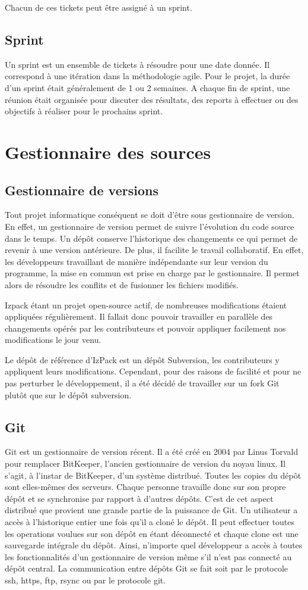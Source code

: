 Chacun de ces tickets peut être assigné à un sprint.
\subsection{Sprint}
Un sprint est un ensemble de tickets à résoudre pour une date donnée.
Il correspond à une itération dans la méthodologie agile.
Pour le projet, la durée d'un sprint était généralement de 1 ou 2 semaines.
A chaque fin de sprint, une réunion était organisée pour discuter des résultats, des reports à effectuer ou des objectifs à réaliser pour le prochains sprint.
\section{Gestionnaire des sources}
\subsection{Gestionnaire de versions}
Tout projet informatique conséquent se doit d'être sous gestionnaire de version.
En effet, un gestionnaire de version permet de suivre l'évolution du code source dans le temps.
Un dépôt conserve l'historique des changements ce qui permet de revenir à une version antérieure.
De plus, il facilite le travail collaboratif.
En effet, les développeurs travaillant de manière indépendante sur leur version du programme, la mise en commun est prise en charge par le gestionnaire.
Il permet alors de résoudre les conflits et de fusionner les fichiers modifiés.

Izpack étant un projet open-source actif, de nombreuses modifications étaient appliquées régulièrement.
Il fallait donc pouvoir travailler en parallèle des changements opérés par les contributeurs et pouvoir appliquer facilement nos modifications le jour venu.

Le dépôt de référence d'IzPack est un dépôt Subversion, les contributeurs y appliquent leurs modifications.
Cependant, pour des raisons de facilité et pour ne pas perturber le développement, il a été décidé de travailler sur un fork Git plutôt que sur le dépôt subversion.
\subsection{Git}
Git est un gestionnaire de version récent. Il a été créé en 2004 par Linus Torvald pour remplacer BitKeeper, l'ancien gestionnaire de version du noyau linux.
Il s'agit, à l'instar de BitKeeper, d'un système distribué.
Toutes les copies du dépôt sont elles-mêmes des serveurs.
Chaque personne travaille donc sur son propre dépôt et se synchronise par rapport à d'autres dépôts.
C'est de cet aspect distribué que provient une grande partie de la puissance de Git.
Un utilisateur a accès à l'historique entier une fois qu'il a cloné le dépôt.
Il peut effectuer toutes les operations voulues sur son dépôt en étant déconnecté et chaque clone est une sauvegarde intégrale du dépôt.
Ainsi, n'importe quel développeur a accès à toutes les fonctionnalités d'un gestionnaire de version même s'il n'est pas connecté au dépôt central.
La communication entre dépôts Git se fait soit par le protocole ssh, https, ftp, rsync ou par le protocole git.


